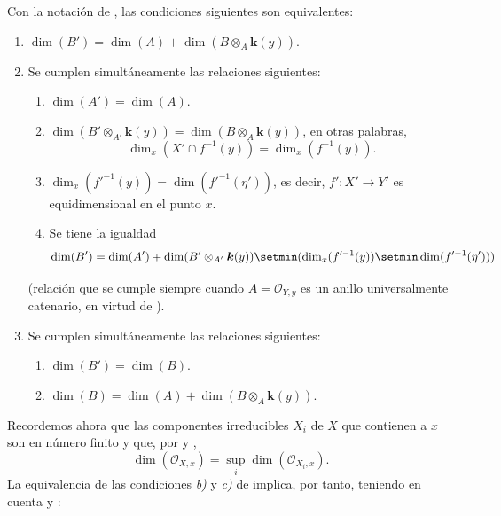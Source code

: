 \begin{lemma}[13.2.5]
\label{IV.13.2.5}
Con la notación de , las condiciones siguientes son equivalentes:
\begin{enumerate}[label=\emph{\alph*)}]
  \item $\dim(B')=\dim(A)+\dim(B\otimes_A\boldsymbol{k}(y))$.
  \item Se cumplen simultáneamente las relaciones siguientes:
  \begin{enumerate}[label=\textup{(\roman*)}]
    \item $\dim(A')=\dim(A)$.
    \item $\dim(B'\otimes_{A'}\boldsymbol{k}(y))=\dim(B\otimes_A\boldsymbol{k}(y))$, en otras palabras,
    \[
      \dim_x(X'\cap f^{-1}(y))=\dim_x(f^{-1}(y)).
    \]
    \item $\dim_x(f'^{-1}(y))=\dim(f'^{-1}(\eta'))$, es decir, $f':X'\to Y'$ es equidimensional  en el punto $x$.
    \item Se tiene la igualdad
    \[
      \dim(B')=\dim(A')+\dim(B'\otimes_{A'}\boldsymbol{k}(y))
      \setmin(\dim_x(f'^{-1}(y))\setmin\dim(f'^{-1}(\eta')))
    \]
  \end{enumerate}
  (relación que se cumple siempre cuando $A=\mathcal O_{Y,y}$ es un anillo universalmente catenario, en virtud de ).
  \item Se cumplen simultáneamente las relaciones siguientes:
  \begin{enumerate}[label=\textup{(\roman*)}]
    \item $\dim(B')=\dim(B)$.
    \item $\dim(B)=\dim(A)+\dim(B\otimes_A\boldsymbol{k}(y))$.
  \end{enumerate}
\end{enumerate}
\end{lemma}

\begin{env}[13.2.6]
\label{IV.13.2.6}
Recordemos ahora que las componentes irreducibles $X_i$ de $X$ que contienen a $x$ son en número finito y que, por  y ,
\[
\tag{13.2.6.1}
\label{IV.13.2.6.1-fr}
  \dim(\mathcal O_{X,x})=\sup_i\dim(\mathcal O_{X_i,x}).
\]
La equivalencia de las condiciones \emph{b)} y \emph{c)} de  implica, por tanto, teniendo en cuenta  y :
\end{env}

